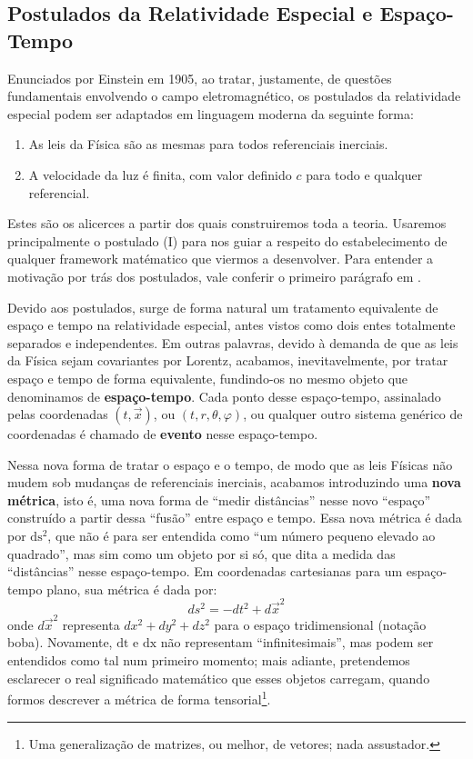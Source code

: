 \documentclass[12pt,a4paper]{article}
\begin{document}
\subsection{Postulados da Relatividade Especial e Espaço-Tempo}
Enunciados por Einstein em 1905, ao tratar, justamente,
de questões fundamentais envolvendo o campo eletromagnético\cite{einstein1905}, os postulados da relatividade
especial podem ser adaptados em linguagem moderna da seguinte forma:
\begin{enumerate}[label=\Roman*.]
  \item As leis da Física são as mesmas para todos referenciais inerciais.
  \item A velocidade da luz é finita, com valor definido $c$ para todo e qualquer referencial.
\end{enumerate}

Estes são os alicerces a partir dos quais construiremos toda a teoria. Usaremos principalmente o postulado (I)
para nos guiar a respeito do estabelecimento de qualquer framework matématico que viermos a desenvolver. Para
entender a motivação por trás dos postulados, vale conferir o primeiro parágrafo em \cite{einstein1905}.

Devido aos postulados, surge de forma natural um tratamento equivalente de espaço e tempo na relatividade
especial, antes vistos como dois entes totalmente separados e independentes. Em outras palavras, devido à demanda
de que as leis da Física sejam covariantes por Lorentz, acabamos, inevitavelmente, por tratar espaço e tempo de
forma equivalente, fundindo-os no mesmo objeto que denominamos de \textbf{espaço-tempo}. Cada ponto desse
espaço-tempo, assinalado pelas coordenadas $(t,\vec{x})$, ou $(t,r,\theta,\varphi)$, ou qualquer outro sistema genérico de
coordenadas é chamado de \textbf{evento} nesse espaço-tempo.

Nessa nova forma de tratar o espaço e o tempo, de modo que as leis Físicas não mudem sob mudanças de referenciais
inerciais, acabamos introduzindo uma \textbf{nova métrica}, isto é, uma nova forma de \enquote{medir distâncias} nesse novo
\enquote{espaço} construído a partir dessa \enquote{fusão} entre espaço e tempo. Essa nova métrica é dada
por $\mathrm{ds^2}$, que não é para ser entendida como \enquote{um número pequeno elevado ao quadrado}, mas sim 
como um objeto por si só, que dita a medida das \enquote{distâncias} nesse espaço-tempo.
Em coordenadas cartesianas para um espaço-tempo plano, sua métrica é dada por:
\begin{equation*}
  ds^2 = -dt^2 + d\vec{x}^2
\end{equation*}
onde $d\vec{x}^2$ representa $dx^2 + dy^2 + dz^2$ para o espaço tridimensional (notação boba). Novamente,
$\mathrm{dt}$ e $\mathrm{dx}$ não representam \enquote{infinitesimais}, mas podem ser entendidos como tal num primeiro momento;
mais adiante, pretendemos esclarecer o real significado matemático que esses objetos carregam, quando formos
descrever a métrica de forma tensorial\footnote{Uma generalização de matrizes, ou melhor, de vetores; nada assustador.}.
\end{document}
